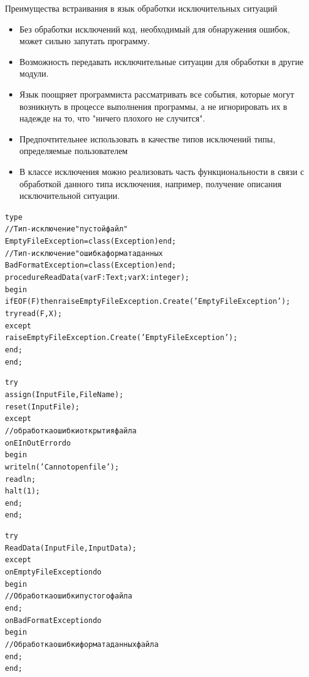 \documentclass{beamer}
\begin{document}
\begin{frame}{Преимущества встраивания в язык обработки исключительных ситуаций}
\begin{itemize}
\item Без обработки исключений код, необходимый для обнаружения ошибок,
может сильно запутать программу. 
\item Возможность передавать исключительные ситуации для обработки в другие модули.
\item Язык поощряет программиста рассматривать все события, которые могут
возникнуть в процессе выполнения программы, а не игнорировать их в надежде на то, что "ничего плохого не случится".
\end{itemize}
\end{frame}

\begin{frame}[fragile]
\begin{itemize}
\item Предпочтительнее использовать в качестве типов исключений типы, определяемые пользователем
\item В классе исключения можно реализовать часть функциональности в связи с обработкой данного типа исключения, например, получение описания исключительной ситуации.
\end{itemize}
\begin{alltt}
type
  // Тип-исключение "пустой файл"
  EmptyFileException = class(Exception) end;
  // Тип-исключение "ошибка формата данных
  BadFormatException = class(Exception) end;
procedure ReadData(var F: Text; var X: integer);
begin
  if EOF(F) then raise EmptyFileException.Create('EmptyFileException');
  try read(F, X);
  except
    raise EmptyFileException.Create('EmptyFileException');
  end;
end;
\end{alltt}
\end{frame}

\begin{frame}[fragile]
\begin{alltt}
  try
    assign(InputFile, FileName);
    reset(InputFile);
  except
    //обработка ошибки открытия файла
    on EInOutError do
      begin
        writeln('Cannot open file');
        readln;
        halt(1);
      end;
  end;
\end{alltt}
\end{frame}

\begin{frame}[fragile]
\begin{alltt}
  try
    ReadData(InputFile, InputData);
  except
    on EmptyFileException do
      begin
        // Обработка ошибки пустого файла
      end;
    on BadFormatException do
      begin
        // Обработка ошибки формата данных файла
      end;
  end;
\end{alltt}
\end{frame}

\end{document}

